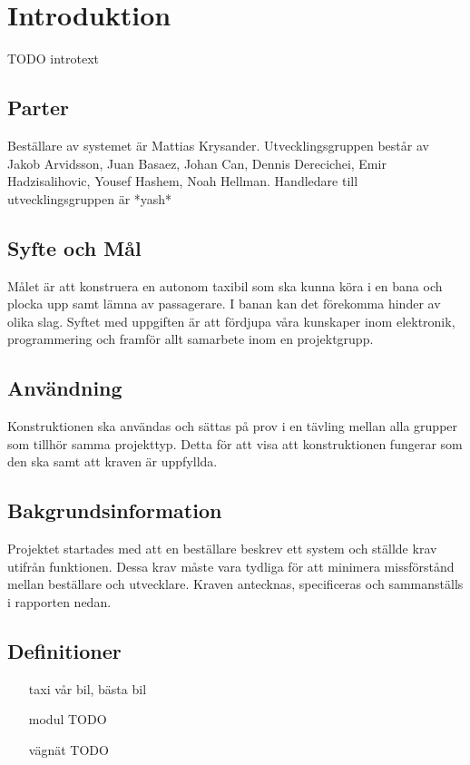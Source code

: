 \documentclass[krav.tex]{subfiles}
\begin{document}
\section{Introduktion}
TODO introtext

\subsection{Parter}
Beställare av systemet är Mattias Krysander.  Utvecklingsgruppen består av
Jakob Arvidsson, Juan Basaez, Johan Can, Dennis Derecichei, Emir
Hadzisalihovic, Yousef Hashem, Noah Hellman.  Handledare till
utvecklingsgruppen är *yash*

\subsection{Syfte och Mål}
Målet är att konstruera en autonom taxibil som ska kunna köra i en bana och
plocka upp samt lämna av passagerare. I banan kan det förekomma hinder av olika
slag. Syftet med uppgiften är att fördjupa våra kunskaper inom elektronik,
programmering och framför allt samarbete inom en projektgrupp.

\subsection{Användning}
Konstruktionen ska användas och sättas på prov i en tävling mellan alla grupper som tillhör samma projekttyp. Detta för att visa att konstruktionen fungerar som den ska samt att kraven är uppfyllda.

\subsection{Bakgrundsinformation}
Projektet startades med att en beställare beskrev ett system och ställde krav
utifrån funktionen. Dessa krav måste vara tydliga för att minimera missförstånd
mellan beställare och utvecklare. Kraven antecknas, specificeras och
sammanställs i rapporten nedan.

\subsection{Definitioner}
\begin{itemize}
    \item[taxi] vår bil, bästa bil
    \item[modul] TODO
    \item[vägnät] TODO
\end{itemize}
\end{document}
